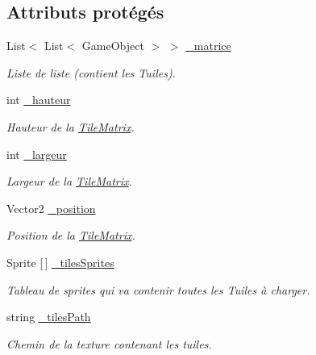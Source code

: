 \subsection*{Attributs protégés}
\begin{DoxyCompactItemize}
\item 
List$<$ List$<$ Game\+Object $>$ $>$ \hyperlink{class_tile_matrix_a6207d77aeeddf839bf1ddec2b6fc322d}{\+\_\+matrice}
\begin{DoxyCompactList}\small\item\em Liste de liste (contient les Tuiles).\end{DoxyCompactList}\item 
int \hyperlink{class_tile_matrix_a4d8f5ec3a0d74fcb8a9ef2310bf4dd10}{\+\_\+hauteur}
\begin{DoxyCompactList}\small\item\em Hauteur de la \hyperlink{class_tile_matrix}{Tile\+Matrix}.\end{DoxyCompactList}\item 
int \hyperlink{class_tile_matrix_a4ea5e0b0b8a31f5ac4ed12d4e179ce6b}{\+\_\+largeur}
\begin{DoxyCompactList}\small\item\em Largeur de la \hyperlink{class_tile_matrix}{Tile\+Matrix}.\end{DoxyCompactList}\item 
Vector2 \hyperlink{class_tile_matrix_af9d70f85f8287561695ada4c09ed1ddc}{\+\_\+position}
\begin{DoxyCompactList}\small\item\em Position de la \hyperlink{class_tile_matrix}{Tile\+Matrix}.\end{DoxyCompactList}\item 
Sprite \mbox{[}$\,$\mbox{]} \hyperlink{class_tile_matrix_a4ce60be6cdb0aa0133b65e1661677583}{\+\_\+tiles\+Sprites}
\begin{DoxyCompactList}\small\item\em Tableau de sprites qui va contenir toutes les Tuiles à charger.\end{DoxyCompactList}\item 
string \hyperlink{class_tile_matrix_afc092c5321540c2a11817ee0b188449d}{\+\_\+tiles\+Path}
\begin{DoxyCompactList}\small\item\em Chemin de la texture contenant les tuiles.\end{DoxyCompactList}\end{DoxyCompactItemize}
